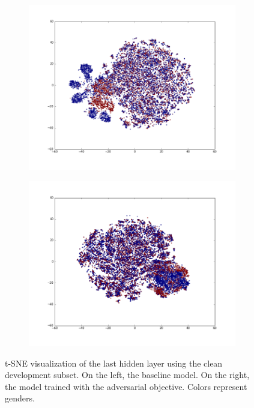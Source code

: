 \documentclass{article}
\begin{document}
\begin{figure}
    \centering
    \begin{subfigure}[b]{0.5\linewidth}
        \centering
        \includegraphics[width=\linewidth]{tsne-original.png}
    \end{subfigure}%
    \begin{subfigure}[b]{0.5\linewidth}
        \centering
        \includegraphics[width=\linewidth]{tsne-invariant.png}
    \end{subfigure}%
    \caption{t-SNE visualization of the last hidden layer using the clean development
    subset. On the left, the baseline
    model. On the right, the model trained with the adversarial objective. Colors 
    represent genders.}
    \label{fig:tsne}
\end{figure}
\end{document}
